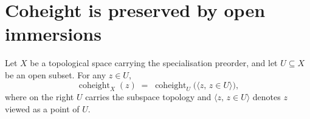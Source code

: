 \section{Coheight is preserved by open immersions}
\label{sec:coheight_topology}


\begin{lemma}\leanok
  \label{lem:coheight_eq_of_isOpenEmbedding}
  Let \(X\) be a topological space carrying the specialisation preorder, and
  let \(U \subseteq X\) be an open subset. For any \(z \in U\),
  \[
    \operatorname{coheight}_{X}(z) \;=\; \operatorname{coheight}_{U}\bigl(\langle z, \, z \in U\rangle\bigr),
  \]
  where on the right \(U\) carries the subspace topology and \(\langle z, \,
  z \in U\rangle\) denotes \(z\) viewed as a point of \(U\).
\end{lemma}


